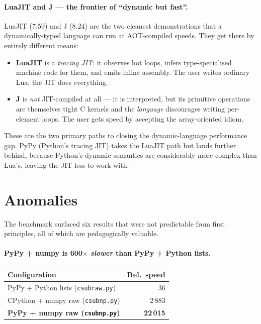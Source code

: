 \documentclass[11pt,a4paper]{article}
\begin{document}
\paragraph{LuaJIT and J --- the frontier of ``dynamic but fast''.}
LuaJIT (7.59) and J (8.24) are the two cleanest demonstrations that
a dynamically-typed language can run at AOT-compiled speeds. They
get there by entirely different means:

\begin{itemize}
\item \textbf{LuaJIT} is a \emph{tracing JIT}: it observes hot loops,
infers type-specialised machine code for them, and emits inline
assembly. The user writes ordinary Lua; the JIT does everything.

\item \textbf{J} is \emph{not} JIT-compiled at all --- it is
interpreted, but its primitive operations are themselves tight C
kernels and the \emph{language} discourages writing per-element
loops. The user gets speed by accepting the array-oriented idiom.
\end{itemize}

\noindent
These are the two primary paths to closing the dynamic-language
performance gap. PyPy (Python's tracing JIT) takes the LuaJIT path
but lands further behind, because Python's dynamic semantics are
considerably more complex than Lua's, leaving the JIT less to work
with.

\section{Anomalies}

The benchmark surfaced six results that were not predictable from
first principles, all of which are pedagogically valuable.

\paragraph{PyPy + numpy is 600$\times$ \emph{slower} than PyPy + Python lists.}

\begin{center}\small
\begin{tabular}{lr}
\toprule
\textbf{Configuration} & \textbf{Rel.~speed} \\
\midrule
PyPy + Python lists (\texttt{csubraw.py}) & 36 \\
CPython + numpy raw (\texttt{csubnp.py}) & 2\,883 \\
\textbf{PyPy + numpy raw (\texttt{csubnp.py})} & \textbf{22\,015} \\
\bottomrule
\end{tabular}
\end{center}
\end{document}
